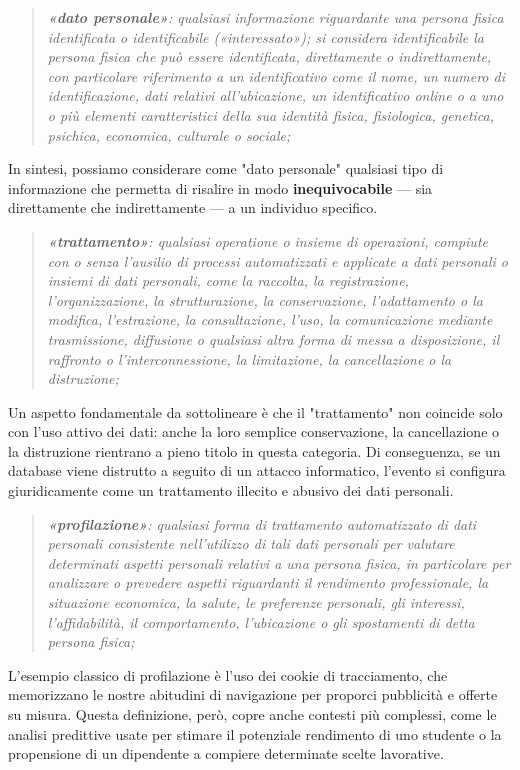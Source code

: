 \begin{quote}
    \textit{\textbf{«dato personale»}: qualsiasi informazione riguardante una persona fisica identificata o identificabile («interessato»); si considera identificabile la persona fisica che può essere identificata, direttamente o indirettamente, con particolare riferimento a un identificativo come il nome, un numero di identificazione, dati relativi all'ubicazione, un identificativo online o a uno o più elementi caratteristici della sua identità fisica, fisiologica, genetica, psichica, economica, culturale o sociale;}
\end{quote}
In sintesi, possiamo considerare come "dato personale" qualsiasi tipo di informazione che permetta di risalire in modo \textbf{inequivocabile} — sia direttamente che indirettamente — a un individuo specifico.  

\begin{quote}
    \textit{\textbf{«trattamento»}: qualsiasi operatione o insieme di operazioni, compiute con o senza l'ausilio di processi automatizzati e applicate a dati personali o insiemi di dati personali, come la raccolta, la registrazione, l'organizzazione, la strutturazione, la conservazione, l'adattamento o la modifica, l'estrazione, la consultazione, l'uso, la comunicazione mediante trasmissione, diffusione o qualsiasi altra forma di messa a disposizione, il raffronto o l'interconnessione, la limitazione, la cancellazione o la distruzione;}
\end{quote}
Un aspetto fondamentale da sottolineare è che il "trattamento" non coincide solo con l'uso attivo dei dati: anche la loro semplice conservazione, la cancellazione o la distruzione rientrano a pieno titolo in questa categoria. Di conseguenza, se un database viene distrutto a seguito di un attacco informatico, l'evento si configura giuridicamente come un trattamento illecito e abusivo dei dati personali.  

\begin{quote}
    \textit{\textbf{«profilazione»}: qualsiasi forma di trattamento automatizzato di dati personali consistente nell'utilizzo di tali dati personali per valutare determinati aspetti personali relativi a una persona fisica, in particolare per analizzare o prevedere aspetti riguardanti il rendimento professionale, la situazione economica, la salute, le preferenze personali, gli interessi, l'affidabilità, il comportamento, l'ubicazione o gli spostamenti di detta persona fisica; }
\end{quote}
L'esempio classico di profilazione è l'uso dei cookie di tracciamento, che memorizzano le nostre abitudini di navigazione per proporci pubblicità e offerte su misura. Questa definizione, però, copre anche contesti più complessi, come le analisi predittive usate per stimare il potenziale rendimento di uno studente o la propensione di un dipendente a compiere determinate scelte lavorative.  

